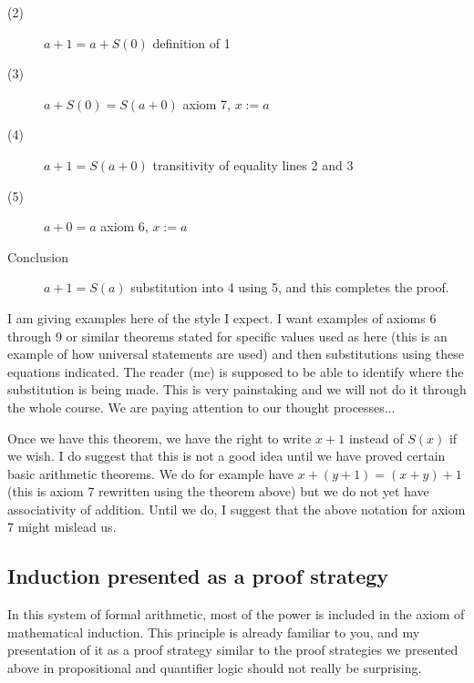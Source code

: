 \documentclass[12pt]{article}
\begin{document}
\begin{description}
\begin{description}
\item[(2)] $a+1 = a+S(0)$  definition of 1

\item[(3)] $a+S(0) = S(a+0)$  axiom 7, $x:=a$

\item[(4)] $a+1 = S(a+0)$  transitivity of equality lines 2 and 3

\item[(5)] $a+0 = a$  axiom 6, $x:=a$

\item[Conclusion] $a+1 = S(a)$ substitution into 4 using 5, and this completes the proof.


\end{description}

\end{description}

I am giving examples here of the style I expect.  I want examples of
axioms 6 through 9 or similar theorems stated for specific values used
as here (this is an example of how universal statements are used) and
then substitutions using these equations indicated.  The reader (me)
is supposed to be able to identify where the substitution is being
made.  This is very painstaking and we will not do it through the
whole course.  We are paying attention to our thought processes...

Once we have this theorem, we have the right to write $x+1$ instead
of $S(x)$ if we wish.  I do suggest that this is not a good idea until
we have proved certain basic arithmetic theorems.  We do for example have
$x+(y+1)=(x+y)+1$ (this is axiom 7 rewritten using the theorem above)
but we do not yet have associativity of addition.  Until we do, I suggest
that the above notation for axiom 7 might mislead us.

\subsection{Induction presented as a proof strategy}

In this system of formal arithmetic, most of the power is included in
the axiom of mathematical induction.  This principle is already
familiar to you, and my presentation of it as a proof strategy similar
to the proof strategies we presented above in propositional and
quantifier logic should not really be surprising.
\end{document}
